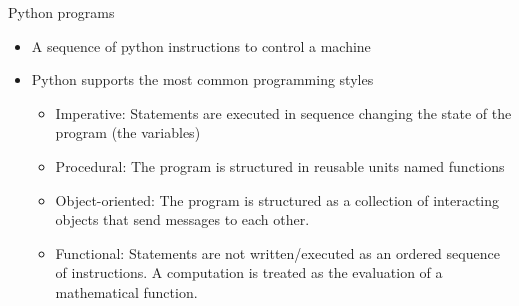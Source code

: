 \documentclass{beamer}%
\begin{document}
\begin{frame}{Python programs}
\begin{itemize}
\item A sequence of python instructions to control a machine
\item Python supports the most common programming styles
\begin{itemize}
\item Imperative: Statements are executed in sequence changing the state of the program (the variables)
\item Procedural: The program is structured in reusable units named functions
\item Object-oriented: The program is structured as a collection of interacting objects that send messages to each other.
\item {\color{gray}Functional: Statements are not written/executed as an ordered sequence of instructions. A computation is treated as the evaluation of a mathematical function.}
\end{itemize}
\end{itemize}
\end{frame}
\end{document}
